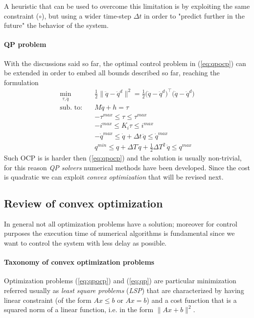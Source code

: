 	A heuristic that can be used to overcome this limitation is by exploiting the same constraint ($\circ$), but using a wider time-step $\Delta t$ in order to "predict further in the future" the behavior of the system.
	
	\paragraph{QP problem} With the discussions said so far, the optimal control problem in (\ref{eq:qpocp}) can be extended in order to embed all bounds described so far, reaching the formulation
	\begin{equation} \label{eq:qp}
		\begin{split}
			\min_{\tau, \ddot q}\quad & \frac 1 2 \big\|\ddot q - \ddot q^d \big\|^2 = \frac 1 2 \big(\ddot q - \ddot q^d\big)^\top \big(\ddot q - \ddot q^d\big) \\
			\textrm{sub. to:}\quad & M \ddot q + h = \tau \\
			& -\tau^{max} \leq \tau \leq \tau^{max} \\
			& -i^{max} \leq K_i \tau \leq i^{max} \\
			& -\dot q^{max} \leq \dot q + \Delta t \, \ddot q \leq \dot q^{max} \\
			& q^{min} \leq q + \Delta T\, \dot q + \frac 1 2 \Delta T^2 \, \ddot q \leq q^{max}
		\end{split}
	\end{equation}
	Such OCP is is harder then (\ref{eq:qpocp}) and the solution is usually non-trivial, for this reason \textit{QP solvers} numerical methods have been developed. Since the cost is quadratic we can exploit \textit{convex optimization} that will be revised next.
	
\subsection{Review of convex optimization} \label{sec:qp}
	In general not all optimization problems have a solution; moreover for control purposes the execution time of numerical algorithms is fundamental since we want to control the system with less delay as possible.
	
	\paragraph{Taxonomy of convex optimization problems} Optimization problems (\ref{eq:qpocp}) and (\ref{eq:qp}) are particular minimization referred usually as \textit{least square problems} (\textit{LSP}) that are characterized by having linear constraint (of the form $Ax\leq b$ or $Ax = b$) and a cost function that is a squared norm of a linear function, i.e. in the form $\|Ax + b\|^2$.
	
